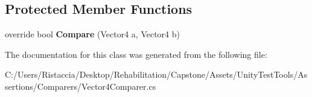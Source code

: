 \subsection*{Protected Member Functions}
\begin{DoxyCompactItemize}
\item 
\mbox{\label{class_unity_test_1_1_vector4_comparer_aaf5eb849fc40e4555293783ae8349a63}} 
override bool {\bfseries Compare} (Vector4 a, Vector4 b)
\end{DoxyCompactItemize}


The documentation for this class was generated from the following file\+:\begin{DoxyCompactItemize}
\item 
C\+:/\+Users/\+Ristaccia/\+Desktop/\+Rehabilitation/\+Capstone/\+Assets/\+Unity\+Test\+Tools/\+Assertions/\+Comparers/Vector4\+Comparer.\+cs\end{DoxyCompactItemize}
